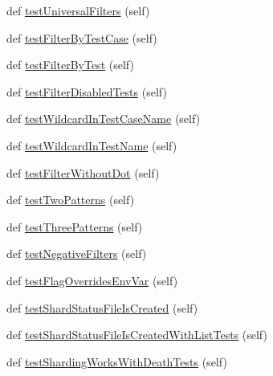 \begin{DoxyCompactItemize}
\item 
def \hyperlink{classgtest__filter__unittest_1_1GTestFilterUnitTest_ae9da48a79483e22e3f986e57de0dee37}{test\+Universal\+Filters} (self)
\item 
def \hyperlink{classgtest__filter__unittest_1_1GTestFilterUnitTest_ac59206c94324afdc09adbe5853856174}{test\+Filter\+By\+Test\+Case} (self)
\item 
def \hyperlink{classgtest__filter__unittest_1_1GTestFilterUnitTest_aaea691324a6c0765403b26a895702a63}{test\+Filter\+By\+Test} (self)
\item 
def \hyperlink{classgtest__filter__unittest_1_1GTestFilterUnitTest_a6d962adae2ee2697b3b92e84b60a795a}{test\+Filter\+Disabled\+Tests} (self)
\item 
def \hyperlink{classgtest__filter__unittest_1_1GTestFilterUnitTest_af855132606c1fa02fb765e8619108114}{test\+Wildcard\+In\+Test\+Case\+Name} (self)
\item 
def \hyperlink{classgtest__filter__unittest_1_1GTestFilterUnitTest_a9b1e6b35e158d7c6d11b8f4d2cb600cb}{test\+Wildcard\+In\+Test\+Name} (self)
\item 
def \hyperlink{classgtest__filter__unittest_1_1GTestFilterUnitTest_a874aea28690300d8c0dc0910304f7ab2}{test\+Filter\+Without\+Dot} (self)
\item 
def \hyperlink{classgtest__filter__unittest_1_1GTestFilterUnitTest_a2563885e647205586b135c5ead55e6ab}{test\+Two\+Patterns} (self)
\item 
def \hyperlink{classgtest__filter__unittest_1_1GTestFilterUnitTest_af4858e153245f0974632fd36dc1dd804}{test\+Three\+Patterns} (self)
\item 
def \hyperlink{classgtest__filter__unittest_1_1GTestFilterUnitTest_aff878809d524797f62e2fe38bbfcc8da}{test\+Negative\+Filters} (self)
\item 
def \hyperlink{classgtest__filter__unittest_1_1GTestFilterUnitTest_a81e4256da0e0ad8cb4b764ffd573cc6d}{test\+Flag\+Overrides\+Env\+Var} (self)
\item 
def \hyperlink{classgtest__filter__unittest_1_1GTestFilterUnitTest_a7a2c7b8d758abba0ae883bbb272f344b}{test\+Shard\+Status\+File\+Is\+Created} (self)
\item 
def \hyperlink{classgtest__filter__unittest_1_1GTestFilterUnitTest_a1dac68948f6170e39ae9ee7bca0bc1eb}{test\+Shard\+Status\+File\+Is\+Created\+With\+List\+Tests} (self)
\item 
def \hyperlink{classgtest__filter__unittest_1_1GTestFilterUnitTest_a4b4f7428d9219dff5960968477927626}{test\+Sharding\+Works\+With\+Death\+Tests} (self)
\end{DoxyCompactItemize}


